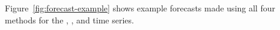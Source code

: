 Figure~\ref{fig:forecast-example} shows example forecasts made using
all four methods for the \col, \gcc, and \svdfive time series.
%
